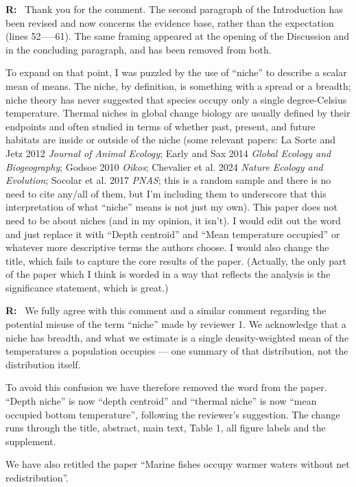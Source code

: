 \documentclass[11pt]{article}
\newcommand{\reviewer}[1]{\par\medskip\noindent\textcolor{revcolor}{#1}\par}
\newenvironment{reply}
{\par\smallskip\begingroup\color{replycolor}\noindent\textbf{R:}\ }
{\endgroup\par\medskip}
\begin{document}
\begin{reply}
Thank you for the comment. The second paragraph of the Introduction has been revised and now concerns the evidence base, rather than the expectation (lines 52-----61). The same framing appeared at the opening of the Discussion and in the concluding paragraph, and has been removed from both.

\end{reply}

\reviewer{To expand on that point, I was puzzled by the use of ``niche'' to describe a scalar mean of means. The niche, by definition, is something with a spread or a breadth; niche theory has never suggested that species occupy only a single degree-Celsius temperature. Thermal niches in global change biology are usually defined by their endpoints and often studied in terms of whether past, present, and future habitats are inside or outside of the niche (some relevant
papers: La Sorte and Jetz 2012 \textit{Journal of Animal Ecology}; Early and Sax 2014 \textit{Global Ecology and Biogeography}; Godsoe 2010 \textit{Oikos}; Chevalier et al. 2024 \textit{Nature Ecology and Evolution}; Socolar et al. 2017 \textit{PNAS}; this is a random sample and there is no need to cite any/all of them, but I'm including them to underscore that this interpretation of what ``niche'' means is not just my own). This paper does not need to be about niches (and in my
opinion, it isn't). I would edit out the word and just replace it with ``Depth centroid'' and ``Mean temperature occupied'' or whatever more descriptive terms the authors choose. I would also change the title, which fails to capture the core results of the paper. (Actually, the only part of the paper which I think is worded in a way that reflects the analysis is the significance statement, which is great.)}

\begin{reply}
We fully agree with this comment and a similar comment regarding the potential misuse of the term ``niche'' made by reviewer 1. We acknowledge that a niche has breadth, and what we estimate is a single density-weighted mean of the temperatures a population occupies --- one summary of that distribution, not the distribution itself. 

To avoid this confusion we have therefore removed the word from the paper. ``Depth niche'' is now ``depth centroid'' and ``thermal niche'' is now ``mean occupied bottom temperature'', following the reviewer's suggestion. The change runs through the title, abstract, main text, Table 1, all figure labels and the supplement.

We have also retitled the paper ``Marine fishes occupy warmer waters without net redistribution''.
\end{reply}
\end{document}
